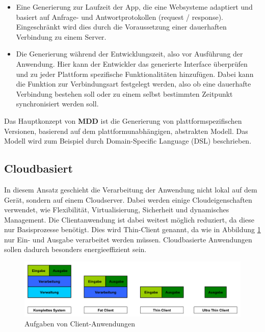 \begin{itemize}
	\item Eine Generierung zur Laufzeit der App, die eine Websysteme adaptiert und basiert auf Anfrage- und Antwortprotokollen (request / response). Eingeschränkt wird dies durch die Voraussetzung einer dauerhaften Verbindung zu einem Server.
	
	\item Die Generierung während der Entwicklungszeit, also vor Ausführung der Anwendung. Hier kann der Entwickler das generierte Interface überprüfen und zu jeder Plattform spezifische Funktionalitäten hinzufügen. Dabei kann die Funktion zur Verbindungsart festgelegt werden, also ob eine dauerhafte Verbindung bestehen soll oder zu einem selbst bestimmten Zeitpunkt synchronisiert werden soll.
\end{itemize}

\bigskip
Das Hauptkonzept von \textbf{MDD} ist die Generierung von plattformspezifischen Versionen, basierend auf dem plattformunabhängigen, abstrakten Modell. Das Modell wird zum Beispiel durch Domain-Specific Language (DSL) beschrieben.

\subsection{Cloudbasiert}
In diesem Ansatz geschieht die Verarbeitung der Anwendung nicht lokal auf dem Gerät, sondern auf einem Cloudserver. Dabei werden einige Cloudeigenschaften verwendet, wie Flexibilität, Virtualisierung, Sicherheit und dynamisches Management. Die Clientanwendung ist dabei weitest möglich reduziert, da diese nur Basisprozesse benötigt. Dies wird Thin-Client genannt, da wie in Abbildung \ref{client_aufgaben} nur Ein- und Ausgabe verarbeitet werden müssen. Cloudbasierte Anwendungen sollen dadurch besonders energieeffizient sein.

\begin{figure}[htbp]
	\centering
	\includegraphics[width=1\textwidth]{Bilder/Aufgaben_Endgeraet}
	\caption{Aufgaben von Client-Anwendungen}\label{client_aufgaben}
\end{figure}


